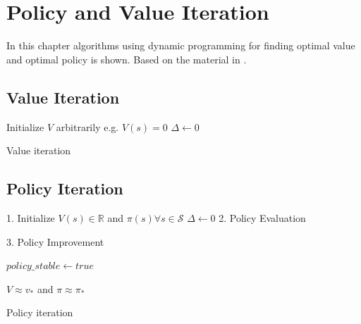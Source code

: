 \documentclass{kththesis}
\theoremstyle{definition}
\begin{document}
\printbibliography[heading=bibintoc] %

\appendix 


\chapter{Policy and Value Iteration}\label{app:A}
In this chapter algorithms using dynamic programming for finding optimal value and optimal policy is shown. Based on the material in \parencite{sutton1998reinforcement}.

\section{Value Iteration}
\LinesNumbered
\begin{algorithm}[H]
 \textsf{Initialize $V$ arbitrarily e.g. $V(s) = 0$} \;
 $\Delta \leftarrow 0$ \;
 \caption{Value iteration}
 \label{alg2}
\end{algorithm}

\section{Policy Iteration}
\LinesNumbered
\begin{algorithm}[H]
 \textsf{1. Initialize} \;
 $V(s) \in \mathbb{R}$ and  $\pi(s) \forall s\in \mathcal{S} $ \;
 $\Delta \leftarrow 0$ \;
 \textsf{2. Policy Evaluation}\;
 
 \textsf{3. Policy Improvement}\;
 
 $policy\_stable \leftarrow true$ \;
 
 \Return $V \approx v_{*}$ and $\pi \approx \pi_{*}$ \;
 \caption{Policy iteration}
 \label{alg1}
\end{algorithm}
\end{document}
